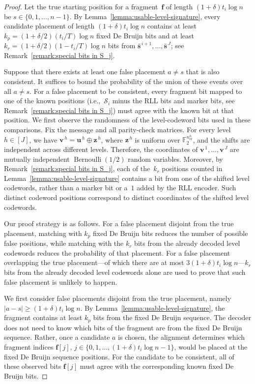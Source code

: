 \documentclass[journal,letterpaper,onecolumn,11pt]{IEEEtran}
\newcommand{\cS}{\mathcal{S}}
\newcommand{\boldf}{\mathbf{f}}
\newcommand{\bolds}{\mathbf{s}}
\newcommand{\boldu}{\mathbf{u}}
\newcommand{\boldv}{\mathbf{v}}
\newcommand{\boldz}{\mathbf{z}}
\begin{document}
\begin{proof}
Let the true starting position for a fragment~$\boldf$ of length $(1+\delta)t_i\log n$ be \(s\in\{0,1,\ldots,n-1\}.\)
By Lemma~\ref{lemma:usable-level-signature}, every candidate placement of
length \((1+\delta)t_i\log n\) contains at least
\(k_{p}=(1+\delta/2)(t_i/T)\log n\) fixed De Bruijn bits and
at least
\(k_{r}=(1+\delta/2)(1-t_i/T)\log n\) bits from $\bar{\bolds}^{\,i+1},\ldots,\bar{\bolds}^{\,J}$; see Remark~\ref{remark:special bits in S_j}.

Suppose that there exists at least one false placement \(a \neq s\) that is also consistent.
It suffices to bound the probability of the union of these events over all \(a \neq s\).
For a false placement to be consistent, every fragment bit mapped to one of the known positions (i.e.,~$\cS_i$ minus the RLL bits and marker bits, see Remark~\ref{remark:special bits in S_j}) must agree with the known bit at that position. 
We first observe the randomness of the level-codeword bits used in these
comparisons. Fix the message and all parity-check matrices. For every
level \(h\in[J]\), we have
\(\boldv^{\,h}=\boldu^{\,h}\oplus\boldz^{\,h}\), where
\(\boldz^{\,h}\) is uniform over
\(\mathbb F_2^{n_{\mathrm{er}}^h}\), and the shifts are independent
across different levels. Therefore, the coordinates of
\(\boldv^{\,1},\ldots,\boldv^{\,J}\) are mutually independent
\(\operatorname{Bernoulli}(1/2)\) random variables. Moreover, by
Remark~\ref{remark:special bits in S_j}, each of the~\(k_r\) positions
counted in Lemma~\ref{lemma:usable-level-signature} contains a bit from one of the shifted level codewords, rather than a marker bit or
a~\(1\) added by the RLL encoder. Such distinct codeword positions
correspond to distinct coordinates of the shifted level codewords.

Our proof strategy is as follows. 
For a false placement disjoint from the true placement, matching with $k_{p}$ fixed De Bruijn bits reduces the number of possible false positions, while matching with the $k_{r}$ bits from the already decoded level codewords reduces the probability of that placement.
For a false placement overlapping the true placement---of which there are at most \(3(1+\delta)t_i\log n\)---$k_{r}$ bits from the already decoded level codewords alone are used to prove that such false placement is unlikely to happen.

We first consider false placements disjoint from the true placement, namely
\( |a-s|\geq(1+\delta)t_i\log n \).
By Lemma~\ref{lemma:usable-level-signature}, the fragment contains at least
\(k_p\) bits from the fixed De Bruijn sequence.
The decoder does not need to know which bits of the fragment are from the
fixed De Bruijn sequence.
Rather, once a candidate \(a\) is chosen, the alignment determines which
fragment indices
\(\boldf[j]\), \(j\in\{0,1,\ldots,(1+\delta)t_i\log n-1\}\),
would be placed at the fixed De Bruijn sequence positions.
For the candidate to be consistent, all of these observed bits
\(\boldf[j]\) must agree with the corresponding known fixed De Bruijn bits.


\end{proof}
\end{document}
